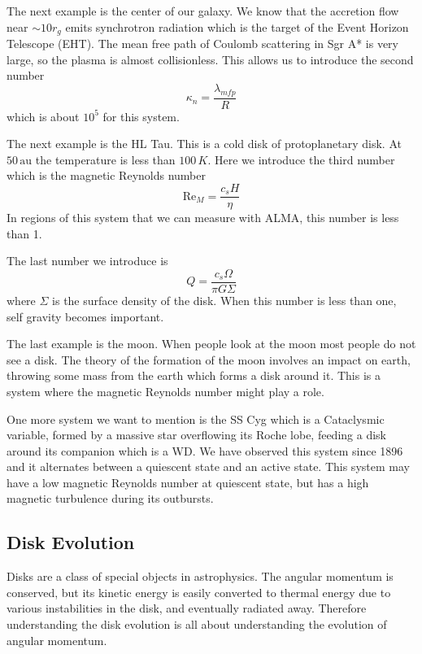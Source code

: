 \documentclass[letterpaper, 11pt]{article}
\numberwithin{equation}{section}
\numberwithin{figure}{section}
\begin{document}
The next example is the center of our galaxy. We know that the accretion flow
near $\sim 10 r_{g}$ emits synchrotron radiation which is the target of the
Event Horizon Telescope (EHT). The mean free path of Coulomb scattering in Sgr
A* is very large, so the plasma is almost collisionless. This allows us to
introduce the second number
\begin{equation}
  \label{eq:2}
\kappa_n = \frac{\lambda_{mfp}}{R}
\end{equation}
which is about $10^5$ for this system.

The next example is the HL Tau. This is a cold disk of protoplanetary disk. At
$50\,\mathrm{au}$ the temperature is less than $100\,K$. Here we introduce the
third number which is the magnetic Reynolds number
\begin{equation}
  \label{eq:3}
  \mathrm{Re}_M = \frac{c_s H}{\eta}
\end{equation}
In regions of this system that we can measure with ALMA, this number is less
than 1.

The last number we introduce is
\begin{equation}
  \label{eq:4}
  Q = \frac{c_s\Omega}{\pi G \Sigma}
\end{equation}
where $\Sigma$ is the surface density of the disk. When this number is less than
one, self gravity becomes important.

The last example is the moon. When people look at the moon most people do not
see a disk. The theory of the formation of the moon involves an impact on earth,
throwing some mass from the earth which forms a disk around it. This is a system
where the magnetic Reynolds number might play a role.

One more system we want to mention is the SS Cyg which is a Cataclysmic
variable, formed by a massive star overflowing its Roche lobe, feeding a disk
around its companion which is a WD. We have observed this system since 1896 and
it alternates between a quiescent state and an active state. This system may
have a low magnetic Reynolds number at quiescent state, but has a high magnetic
turbulence during its outbursts.

\subsection{Disk Evolution}

Disks are a class of special objects in astrophysics. The angular momentum is
conserved, but its kinetic energy is easily converted to thermal energy due to
various instabilities in the disk, and eventually radiated away. Therefore
understanding the disk evolution is all about understanding the evolution of
angular momentum.
\end{document}
